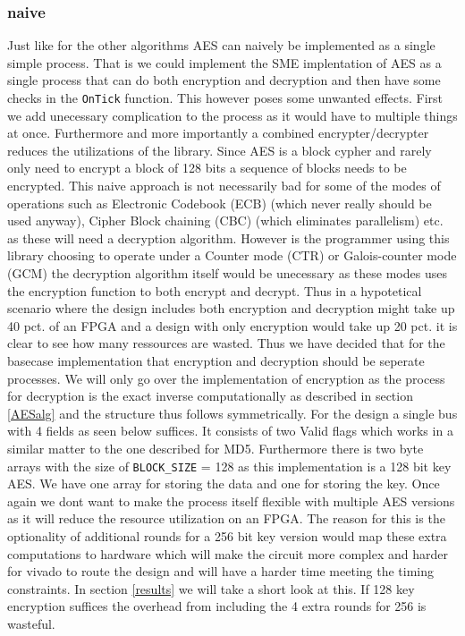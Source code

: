 \documentclass[a4paper]{article}
\begin{document}
\subsubsection{naive}
\label{AESnaive}
Just like for the other algorithms AES can naively be implemented as a single simple process. That is we could implement the SME implentation of AES as a single process that can do both encryption and decryption and then have some checks in the \texttt{OnTick} function. This however poses some unwanted effects. First we add unecessary complication to the process as it would have to multiple things at once. Furthermore and more importantly a combined encrypter/decrypter reduces the utilizations of the library. Since AES is a block cypher and rarely only need to encrypt a block of 128 bits a sequence of blocks needs to be encrypted. This naive approach is not necessarily bad for some of the modes of operations such as Electronic Codebook (ECB) (which never really should be used anyway), Cipher Block chaining (CBC) (which eliminates parallelism) etc. as these will need a decryption algorithm. However is the programmer using this library choosing to operate under a Counter mode (CTR) or Galois-counter mode (GCM) the decryption algorithm itself would be unecessary as these modes uses the encryption function to both encrypt and decrypt. Thus in a hypotetical scenario where the design includes both encryption and decryption might take up 40 pct. of an FPGA and a design with only encryption would take up 20 pct. it is clear to see how many ressources are wasted. Thus we have decided that for the basecase implementation that encryption and decryption should be seperate processes. We will only go over the implementation of encryption as the process for decryption is the exact inverse computationally as described in section \ref{AESalg} and the structure thus follows symmetrically. For the design a single bus with 4 fields as seen below suffices. It consists of two Valid flags which works in a similar matter to the one described for MD5. Furthermore there is two byte arrays with the size of \texttt{BLOCK\_SIZE} = 128 as this implementation is a 128 bit key AES. We have one array for storing the data and one for storing the key. Once again we dont want to make the process itself flexible with multiple AES versions as it will reduce the resource utilization on an FPGA. The reason for this is the optionality of additional rounds for a 256 bit key version would map these extra computations to hardware which will make the circuit more complex and harder for vivado to route the design and will have a harder time meeting the timing constraints. In section \ref{results} we will take a short look at this. If 128 key encryption suffices the overhead from including the 4 extra rounds for 256 is wasteful.
\end{document}
